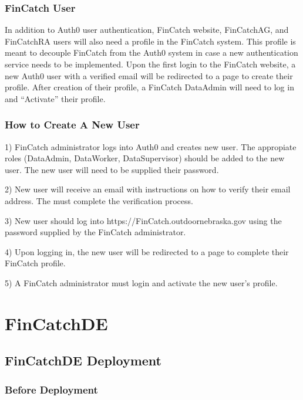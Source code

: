 \documentclass[
  letterpaper,
  DIV=11,
  numbers=noendperiod]{scrreprt}
\begin{document}
\section{FinCatch User}\label{fincatch-user}

In addition to Auth0 user authentication, FinCatch website, FinCatchAG,
and FinCatchRA users will also need a profile in the FinCatch system.
This profile is meant to decouple FinCatch from the Auth0 system in case
a new authentication service needs to be implemented. Upon the first
login to the FinCatch website, a new Auth0 user with a verified email
will be redirected to a page to create their profile. After creation of
their profile, a FinCatch DataAdmin will need to log in and ``Activate''
their profile.

\section{How to Create A New User}\label{how-to-create-a-new-user}

1) FinCatch administrator logs into Auth0 and creates new user. The
appropiate roles (DataAdmin, DataWorker, DataSupervisor) should be added
to the new user. The new user will need to be supplied their password.

2) New user will receive an email with instructions on how to verify
their email address. The must complete the verification process.

3) New user should log into https://FinCatch.outdoornebraska.gov using
the password supplied by the FinCatch administrator.

4) Upon logging in, the new user will be redirected to a page to
complete their FinCatch profile.

5) A FinCatch administrator must login and activate the new user's
profile.

\part{FinCatchDE}

\chapter{FinCatchDE Deployment}\label{fincatchde-deployment}

\section{\texorpdfstring{\textbf{Before
Deployment}}{Before Deployment}}\label{before-deployment}
\end{document}

